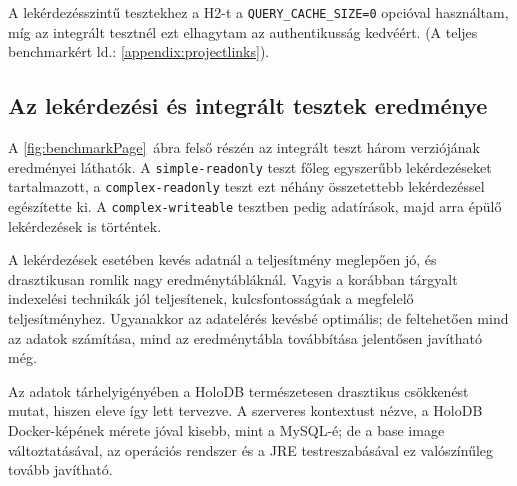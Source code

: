 \documentclass[
    parspace,
    noindent,
    nohyp,
]{elteiktdk}[2023/04/10]
\newcommand{\todoref}[1]{\todo[inline, noinlinepar, color=red, textcolor=white, inlinewidth=0.6cm, caption={#1}]{\large \textbf{×}}}
\begin{document}
A lekérdezésszintű tesztekhez a H2-t a \texttt{QUERY\_CACHE\_SIZE{=}0} opcióval használtam,
míg az integrált tesztnél ezt elhagytam az authentikusság kedvéért.
(A teljes benchmarkért ld.: \autoref{appendix:projectlinks}).

\todoref{További mérések: ...}

\subsection{Az lekérdezési és integrált tesztek eredménye}

A \ref{fig:benchmarkPage}~ábra felső részén
az integrált teszt három verziójának eredményei láthatók.
A \texttt{simple-readonly} teszt főleg egyszerűbb lekérdezéseket tartalmazott,
a \texttt{complex-readonly} teszt ezt néhány összetettebb lekérdezéssel egészítette ki.
A \texttt{complex-writeable} tesztben pedig adatírások,
majd arra épülő lekérdezések is történtek.

A lekérdezések esetében kevés adatnál a teljesítmény meglepően jó,
és drasztikusan romlik nagy eredménytábláknál.
Vagyis a korábban tárgyalt indexelési technikák jól teljesítenek,
kulcsfontosságúak a megfelelő teljesítményhez.
Ugyanakkor az adatelérés kevésbé optimális;
de feltehetően mind az adatok számítása, mind az eredménytábla továbbítása jelentősen javítható még.

Az adatok tárhelyigényében a HoloDB természetesen drasztikus csökkenést mutat,
hiszen eleve így lett tervezve.
A szerveres kontextust nézve, a HoloDB Docker-képének mérete jóval kisebb, mint a MySQL-é;
de a base image változtatásával,
az operációs rendszer és a JRE testreszabásával ez valószínűleg tovább javítható.

\cleardoublepage
\end{document}
